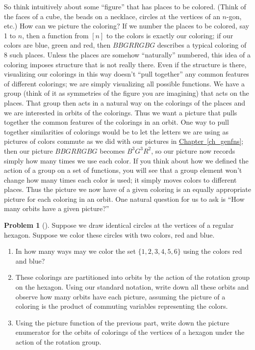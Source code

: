 \documentclass[10pt,]{book}
\theoremstyle{plain}
\theoremstyle{definition}
\newtheorem{activity}[project]{Problem}
\theoremstyle{definition}
\numberwithin{equation}{chapter}
\begin{document}
So think intuitively about some ``figure'' that has places to be colored. (Think of the faces of a cube, the beads on a necklace, circles at the vertices of an \(n\)-gon, etc.) How can we picture the coloring? If we number the places to be colored, say 1 to \(n\), then a function from \([n]\) to the colors is exactly our coloring; if our colors are blue, green and red, then \(BBGRRGBG\) describes a typical coloring of 8 such places. Unless the places are somehow ``naturally'' numbered, this idea of a coloring imposes structure that is not really there. Even if the structure is there, visualizing our colorings in this way doesn't ``pull together'' any common features of different colorings; we are simply visualizing all possible functions. We have a group (think of it as symmetries of the figure you are imagining) that acts on the places. That group then acts in a natural way on the colorings of the places and we are interested in orbits of the colorings. Thus we want a picture that pulls together the common features of the colorings in an orbit. One way to pull together similarities of colorings would be to let the letters we are using as pictures of colors commute as we did with our pictures in \hyperref[ch_genfns]{Chapter~\ref{ch_genfns}}; then our picture \(BBGRRGBG\) becomes \(B^3G^3R^2\), so our picture now records simply how many times we use each color. If you think about how we defined the action of a group on a set of functions, you will see that a group element won't change how many times each color is used; it simply moves colors to different places. Thus the picture we now have of a given coloring is an equally appropriate picture for each coloring in an orbit. One natural question for us to ask is ``How many orbits have a given picture?''%
\begin{activity}[]\marginsymbol[-1em]{} \label{coloredhex}
Suppose we draw identical circles at the vertices of a regular hexagon. Suppose we color these circles with two colors, red and blue.%
\begin{enumerate}[font=\bfseries,label=(\alph*),ref=\alph*]
\item\label{task-230} \marginsymbol[-2.5em]{} In how many ways may we color the set \(\{1, 2, 3, 4, 5, 6\}\) using the colors red and blue?%
\item\label{task-231} \marginsymbol[-2.5em]{} These colorings are partitioned into orbits by the action of the rotation group on the hexagon. Using our standard notation, write down all these orbits and observe how many orbits have each picture, assuming the picture of a coloring is the product of commuting variables representing the colors.%
\item\label{picture-enumerator-hexagon} \marginsymbol[-2.5em]{} Using the picture function of the previous part, write down the picture enumerator for the orbits of colorings of the vertices of a hexagon under the action of the rotation group.%
\end{enumerate}
\end{activity}
\end{document}
